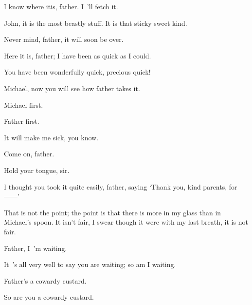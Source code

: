 \begin{drama}
I know where itis, father.
I~’ll fetch it.


\mrdarlingspeaks
John, it is the most beastly stuff.
It is that sticky sweet kind.

Never mind, father, it will soon be over.


\wendyspeaks
Here it is, father; I have been as quick as I could.

You have been wonderfully quick, precious quick!


Michael, now you will see how father takes it.

Michael first.

Father first.

\mrdarlingspeaks
It will make me sick, you know.

Come on, father.

\mrdarlingspeaks
Hold your tongue, sir.

I thought you took it quite easily, father, saying ‘Thank you, kind parents, for——’

\mrdarlingspeaks
That is not the point; the point is that there is more in my glass than in Michael’s spoon.
It isn’t fair, I swear though it were with my last breath, it is not fair.

Father, I~’m waiting.

\mrdarlingspeaks
It~’s all very well to say you are waiting; so am I waiting.

\michaelspeaks
Father’s a cowardy custard.

\mrdarlingspeaks
So are you a cowardy custard.



\end{drama}
